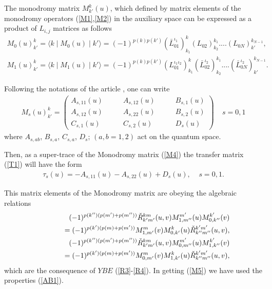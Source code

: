 \documentclass[a4paper,12pt]{article}
\newcommand{\nn}{\nonumber}
\begin{document}
The monodromy matrix $M_{k'}^{k}(u)$, which defined by matrix 
elements of the monodromy operators (\ref{M1},\ref{M2}) in the auxiliary 
space  can be expressed as a product  of $L_{i,j}$ matrices as follows
\begin{eqnarray}
\label{M3}
M_{0}(u)_{k'}^{k}=\langle{k}\mid{M}_{0}(u)\mid{k'}\rangle
=(-1)^{p(k)p(k')}(\bar{L}_{01}^{\iota_1})_{k_1}^k
(L_{02})_{k_2}^{k_1}....(L_{0N})_{k'}^{k_{N-1}}, \nonumber\\
M_{1}(u)_{k'}^{k}=\langle{k}\mid{M}_{1}(u)\mid{k'}\rangle
=(-1)^{p(k)p(k')}(L_{01}^{{\iota_1}{\iota_2}})_{k_1}^{k}
(\bar{L}_{02}^{\iota_2})_{k_2}^{k_1}....(\bar{L}_{0N}^{\iota_2})_{k'}^{k_{N-1}}.
\end{eqnarray}

Following the notations of the article \cite{EK}, one can write 
\begin{eqnarray}
\label{M4}
M_{s}(u)_{k'}^{k}=\left(
\begin{array}{lll}
A_{s,11}(u)\qquad &A_{s,12}(u)\qquad &B_{s,1}(u)\\
A_{s,12}(u)\qquad &A_{s,22}(u)\qquad &B_{s,2}(u)\\
C_{s,1}(u)\qquad &C_{s,2}(u)\qquad &D_{s}(u)
\end{array}
\right)\;\;\;\;
s=0,1
\end{eqnarray}
where $A_{s,ab}$, $B_{s,a}$, $C_{s,a}$, $D_{s}$; $(a,b=1,2)$ 
act on the quantum space.

Then, as a super-trace of the Monodromy matrix (\ref{M4}) the
transfer matrix (\ref{T1}) will have the form
\begin{eqnarray}
\label{T2}
\tau_{s}(u)=-A_{s,11}(u)-A_{s,22}(u)+D_{s}(u),\;\;\;\;s=0,1.
\end{eqnarray}  

This matrix elements of the Monodromy matrix are obeying the 
algebraic relations 
\begin{eqnarray}
\label{M5}
&&\hspace{-1cm}(-1)^{p(k'')(p(m')+p(m''))}
\check{R}_{k'm'}^{km}(u,v)M_{1,m''}^{m'}(u)M_{0,k''}^{k'}(v)\nn\\
&&\hspace{1cm}=(-1)^{p(k')(p(m)+p(m'))}
M_{1,m'}^{m}(v)M_{0,k'}^{k}(u)
\check{R}_{k''m''}^{k'm'}(u,v),\nonumber\\
&&\hspace{-1cm}(-1)^{p(k'')(p(m')+p(m''))}
\check{R}_{k'm'}^{km}(u,v)M_{0,m''}^{m'}(u)M_{1,k''}^{k'}(v)\nn\\
&&\hspace{1cm}=(-1)^{p(k')(p(m)+p(m'))}
M_{0,m'}^{m}(v)M_{1,k'}^{k}(u)\check{R}_{k''m''}^{k'm'}(u,v),
\end{eqnarray}
which are the consequence of $YBE$ (\ref{R3}-\ref{R4}).
In getting (\ref{M5}) we have used the properties (\ref{AB1}).
\end{document}
